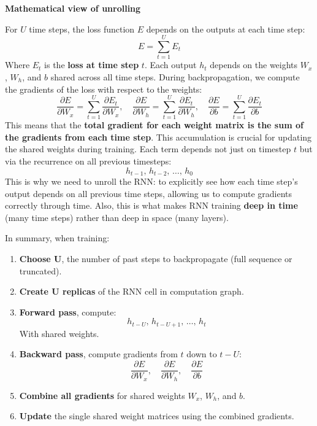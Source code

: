 \highspace
\begin{flushleft}
    \textcolor{Green3}{ \textbf{Mathematical view of unrolling}}
\end{flushleft}
For $U$ time steps, the loss function $E$ depends on the outputs at each time step:
\begin{equation*}
    E = \sum_{t=1}^{U} E_t
\end{equation*}
Where $E_t$ is the \textbf{loss at time step} $t$. Each output $h_t$ depends on the weights $W_x$, $W_h$, and $b$ shared across all time steps. During backpropagation, we compute the gradients of the loss with respect to the weights:
\begin{equation*}
    \frac{\partial E}{\partial W_x} = \sum_{t=1}^{U} \frac{\partial E_t}{\partial W_x}, \quad
    \frac{\partial E}{\partial W_h} = \sum_{t=1}^{U} \frac{\partial E_t}{\partial W_h}, \quad
    \frac{\partial E}{\partial b} = \sum_{t=1}^{U} \frac{\partial E_t}{\partial b}
\end{equation*}
This means that the \textbf{total gradient for each weight matrix is the sum of the gradients from each time step}. This accumulation is crucial for updating the shared weights during training. Each term depends not just on timestep $t$ but via the recurrence on all previous timesteps:
\begin{equation*}
    h_{t-1}, \, h_{t-2}, \, \ldots, \, h_0
\end{equation*}
This is why we need to unroll the RNN: to explicitly see how each time step's output depends on all previous time steps, allowing us to compute gradients correctly through time. Also, this is what makes RNN training \textbf{deep in time} (many time steps) rather than deep in space (many layers).

\highspace
In summary, when training:
\begin{enumerate}
    \item \textbf{Choose U}, the number of past steps to backpropagate (full sequence or truncated).
    \item \textbf{Create U replicas} of the RNN cell in computation graph.
    \item \textbf{Forward pass}, compute:
    \begin{equation*}
        h_{t-U}, \, h_{t-U+1}, \, \ldots, \, h_{t}
    \end{equation*}
    With shared weights.
    \item \textbf{Backward pass}, compute gradients from $t$ down to $t-U$:
    \begin{equation*}
        \frac{\partial E}{\partial W_x}, \quad \frac{\partial E}{\partial W_h}, \quad \frac{\partial E}{\partial b}
    \end{equation*}
    \item \textbf{Combine all gradients} for shared weights $W_x$, $W_h$, and $b$.
    \item \textbf{Update} the single shared weight matrices using the combined gradients.
\end{enumerate}

